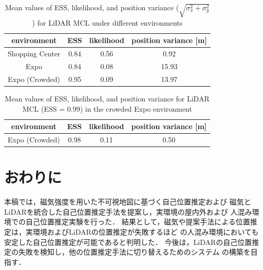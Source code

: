 \begin{table}[t]
  \centering
  \caption{Mean values of ESS, likelihood, and position variance ($\sqrt{\sigma_x^2+\sigma_y^2}$) for LiDAR MCL under different environments}
  \label{tab:lidar_env_comparison}
  \begin{tabular}{|c|c|c|c|}
    \hline
    environment & ESS & likelihood & position variance [m] \\
    \hline
    Shopping Center & 0.84 & 0.56 & 0.92 \\
    Expo & 0.84 & 0.08 & 15.93 \\
    Expo (Crowded) & 0.95 & 0.09 & 13.97 \\
    \hline
  \end{tabular}
\end{table}
\begin{table}[t]
  \centering
  \caption{Mean values of ESS, likelihood, and position variance for LiDAR MCL (ESS = 0.99) in the crowded Expo environment}
  \label{tab:lidar_ess99}
  \begin{tabular}{|c|c|c|c|}
    \hline
    environment & ESS & likelihood & position variance [m] \\
    \hline
    Expo (Crowded) & 0.98 & 0.11 & 0.50 \\
    \hline
  \end{tabular}
\end{table}

\section{おわりに}
本稿では，磁気強度を用いた不可視地図に基づく自己位置推定および
磁気とLiDARを統合した自己位置推定手法を提案し，実環境の屋内外および
人混み環境での自己位置推定実験を行った．
結果として，磁気や提案手法による位置推定は，実環境およびLiDARの位置推定が失敗するほど
の人混み環境においても安定した自己位置推定が可能であると判明した．
今後は，LiDARの自己位置推定の失敗を検知し，他の位置推定手法に切り替えるためのシステム
の構築を目指す．